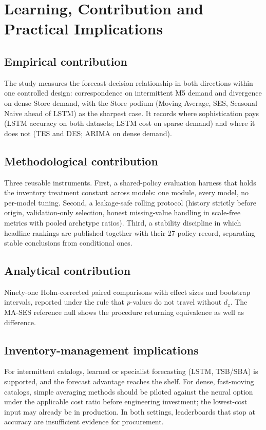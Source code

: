 \section{Learning, Contribution and Practical Implications}
\label{sec:contrib}

\subsection{Empirical contribution}
\label{sec:c-emp}
The study measures the forecast-decision relationship in both directions
within one controlled design: correspondence on intermittent M5 demand and
divergence on dense Store demand, with the Store podium (Moving Average,
SES, Seasonal Naive ahead of LSTM) as the sharpest case. It records where
sophistication pays (LSTM accuracy on both datasets; LSTM cost on sparse
demand) and where it does not (TES and DES; ARIMA on dense demand).

\subsection{Methodological contribution}
\label{sec:c-meth}
Three reusable instruments. First, a shared-policy evaluation harness that
holds the inventory treatment constant across models: one module, every
model, no per-model tuning. Second, a leakage-safe rolling protocol (history
strictly before origin, validation-only selection, honest missing-value
handling in scale-free metrics with pooled archetype ratios). Third, a
stability discipline in which headline rankings are published together with
their 27-policy record, separating stable conclusions from conditional ones.

\subsection{Analytical contribution}
\label{sec:c-anal}
Ninety-one Holm-corrected paired comparisons with effect sizes and bootstrap
intervals, reported under the rule that $p$-values do not travel without
$d_z$. The MA-SES reference null shows the procedure returning equivalence
as well as difference.

\subsection{Inventory-management implications}
\label{sec:c-inv}
For intermittent catalogs, learned or specialist forecasting (LSTM, TSB/SBA)
is supported, and the forecast advantage reaches the shelf. For dense,
fast-moving catalogs, simple averaging methods should be piloted against the
neural option under the applicable cost ratio before engineering investment;
the lowest-cost input may already be in production. In both settings,
leaderboards that stop at accuracy are insufficient evidence for procurement.

